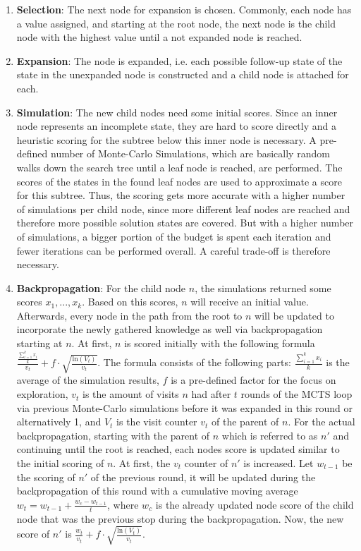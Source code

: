 \begin{enumerate}
    \item \textbf{Selection}: The next node for expansion is chosen.
    Commonly, each node has a value assigned, and starting at the root node, the next node is the child node with the highest value until a not expanded node is reached.
    \item \textbf{Expansion}: The node is expanded, i.e. each possible follow-up state of the state in the unexpanded node is constructed and a child node is attached for each.
    \item \textbf{Simulation}: The new child nodes need some initial scores.
    Since an inner node represents an incomplete state, they are hard to score directly and a heuristic scoring for the subtree below this inner node is necessary.
    A pre-defined number of Monte-Carlo Simulations, which are basically random walks down the search tree until a leaf node is reached, are performed.
    The scores of the states in the found leaf nodes are used to approximate a score for this subtree.
    Thus, the scoring gets more accurate with a higher number of simulations per child node, since more different leaf nodes are reached and therefore more possible solution states are covered.
    But with a higher number of simulations, a bigger portion of the budget is spent each iteration and fewer iterations can be performed overall.
    A careful trade-off is therefore necessary.
    \item \textbf{Backpropagation}: For the child node $n$, the simulations returned some scores $x_1, ..., x_k$.
    Based on this scores, $n$ will receive an initial value.
    Afterwards, every node in the path from the root to $n$ will be updated to incorporate the newly gathered knowledge as well via backpropagation starting at $n$.
    At first, $n$ is scored initially with the following formula $\frac{\frac{\sum_{i=1}^k x_i}{k}}{v_t} + f \cdot \sqrt{\frac{\mathrm{ln} (V_t)}{v_t}}$.
    The formula consists of the following parts: $\frac{\sum_{i=1}^k x_i}{k}$ is the average of the simulation results, $f$ is a pre-defined factor for the focus on exploration, $v_t$ is the amount of visits $n$ had after $t$ rounds of the MCTS loop via previous Monte-Carlo simulations before it was expanded in this round or alternatively 1, and $V_t$ is the visit counter $v_t$ of the parent of $n$.
    For the actual backpropagation, starting with the parent of $n$ which is referred to as $n'$ and continuing until the root is reached, each nodes score is updated similar to the initial scoring of $n$.
    At first, the $v_t$ counter of $n'$ is increased.
    Let $w_{t-1}$ be the scoring of $n'$ of the previous round, it will be updated during the backpropagation of this round with a cumulative moving average $w_t=w_{t-1} + \frac{w_c - w_{t-1}}{t}$, where $w_c$ is the already updated node score of the child node that was the previous stop during the backpropagation.
    Now, the new score of $n'$ is $\frac{w_t}{v_t} + f \cdot \sqrt{\frac{\mathrm{ln} (V_t)}{v_t}}$.
\end{enumerate}
